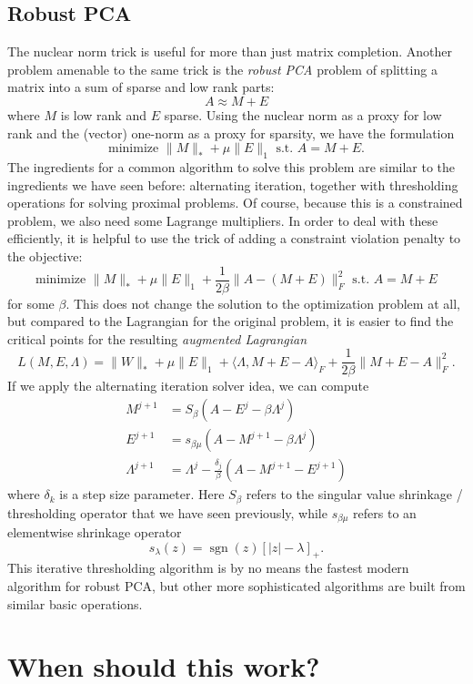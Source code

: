 \documentclass[12pt, leqno]{article} %
\begin{document}
\subsection{Robust PCA}

The nuclear norm trick is useful for more than just matrix completion.
Another problem amenable to the same trick is the {\em robust PCA}
problem of splitting a matrix into a sum of sparse and low rank parts:
\[
  A \approx M+E
\]
where $M$ is low rank and $E$ sparse.  Using the nuclear norm as a
proxy for low rank and the (vector) one-norm as a proxy for sparsity,
we have the formulation
\[
  \mbox{minimize } \|M\|_* + \mu \|E\|_1 \mbox{ s.t. } A = M+E.
\]
The ingredients for a common algorithm to solve this problem are
similar to the ingredients we have seen before: alternating iteration,
together with thresholding operations for solving proximal problems.
Of course, because this is a constrained problem, we also need some
Lagrange multipliers.  In order to deal with these efficiently, it
is helpful to use the trick of adding
a constraint violation penalty to the objective:
\[
  \mbox{minimize } \|M\|_* + \mu \|E\|_1 + \frac{1}{2\beta}
  \|A-(M+E)\|_F^2 \mbox{ s.t. } A = M+E
\]
for some $\beta$.  This does not change the solution to the
optimization problem at all, but compared to the Lagrangian for the
original problem, it is easier to find the critical points for
the resulting {\em augmented Lagrangian}
\[
  L(M,E,\Lambda) =
    \|W\|_* + \mu \|E\|_1 +
    \langle \Lambda, M+E-A \rangle_F +
    \frac{1}{2\beta} \|M+E-A\|_F^2.
\]
If we apply the alternating iteration solver idea, we can compute
\begin{align*}
  M^{j+1} &= S_{\beta}(A-E^j - \beta \Lambda^j) \\
  E^{j+1} &= s_{\beta \mu} (A-M^{j+1}-\beta \Lambda^j) \\
  \Lambda^{j+1} &= \Lambda^j - \frac{\delta_j}{\beta} (A-M^{j+1}-E^{j+1})
\end{align*}
where $\delta_k$ is a step size parameter.  Here $S_{\beta}$ refers to
the singular value shrinkage / thresholding operator that we have seen
previously, while $s_{\beta \mu}$ refers to an elementwise shrinkage
operator
\[
  s_{\lambda}(z) = \operatorname{sgn}(z) [|z|-\lambda]_+.
\]
This iterative thresholding algorithm is by no means the fastest
modern algorithm for robust PCA, but other more sophisticated
algorithms are built from similar basic operations.

\section{When should this work?}
\end{document}
